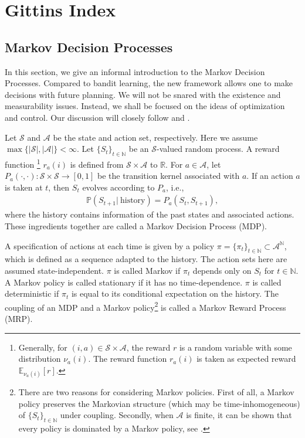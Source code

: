 \documentclass[letterpaper,11pt,openright,openany]{book}
\numberwithin{equation}{section}
\theoremstyle{plain}
\theoremstyle{definition}
\def\R{{\mathbb R}}
\def\N{{\mathbb N}}
\def\E{{\mathbb E}}
\def\R{{\mathbb R}}
\def\P{{\mathbb P}}
\def\S{{\mathcal S}}
\def\A{{\mathcal A}}
\begin{document}
 

\chapter{Gittins Index}\label{ch:5}

\section{Markov Decision Processes}

In this section, we give an informal introduction to the Markov Decision Processes.
Compared to bandit learning, the new framework allows one to make decisions with future planning.    
We will not be snared with the existence and measurability issues. 
Instead, we shall be focused on the ideas of optimization and control. 
Our discussion will closely follow \cite{szepesvari2010algorithms} and \cite{lattimore2018bandit}. 

Let $\S$ and $\A$ be the state and action set, respectively. Here we assume $\max\{|\S|, |\A|\}<\infty$.
Let $\{S_t\}_{t\in\N}$ be an $\S$-valued random process.
A reward function 
\footnote{Generally, for $(i, a)\in\S\times\A$, the reward $r$ is a random variable with some distribution $\nu_{a}(i)$. The reward function $r_{a}(i)$ is taken as expected reward $\E_{\nu_a(i)}[r]$.} $r_a(i)$ is defined from $\S\times\A$ to $\R$. 
For $a\in\A$, let $P_a(\cdot, \cdot):\S\times\S\to [0,1]$ be the transition kernel
associated with $a$.
If an action $a$ is taken at $t$, then $S_t$ evolves according to $P_a$, i.e., 
\begin{align*}
\P\left(S_{t+1}|\ \text{history}\right) = P_a(S_t, S_{t+1}),
\end{align*}
where the history contains information of the past states and associated actions. These ingredients together are called a Markov Decision Process (MDP). 

A specification of actions at each time is given by a policy $\pi=\{\pi_t\}_{t\in\N}\subset\A^{\N}$, which is defined as a sequence adapted to the history. 
The action sets here are assumed state-independent. 
$\pi$ is called Markov if $\pi_t$ depends only on $S_t$ for $t\in\N$. 
A Markov policy is called stationary if it has no time-dependence. 
$\pi$ is called deterministic if $\pi_t$ is equal to its conditional expectation on the history. 
The coupling of an MDP and a Markov policy\footnote{There are two reasons for considering Markov policies. First of all, a Markov policy preserves the Markovian structure (which may be time-inhomogeneous) of $\{S_t\}_{t\in\N}$ under coupling. Secondly, when $\A$ is finite, it can be shown that every policy is dominated by a Markov policy, see \cite{puterman2014markov}.} is called a Markov Reward Process (MRP).  
\end{document}

